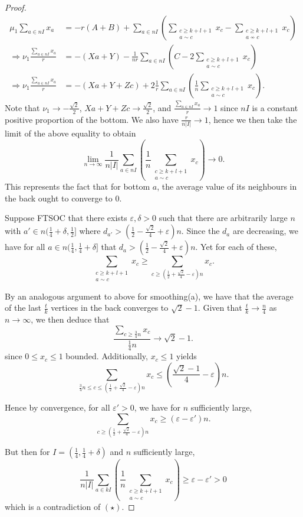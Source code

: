 \documentclass[11pt]{article}
\begin{document}
\begin{proof}
    \begin{align*}
        \mu_1 \sum_{a \in nI} x_a &= -r(A+B) + \sum_{a \in nI} \left(\sum_{\substack{c \ge k+l+1 \\ a \sim c}} x_c - \sum_{\substack{c \ge k+l+1 \\ a \not \sim c}} x_c\right) \\
        \Rightarrow \nu_1 \frac{\sum\limits_{a \in nI} x_a}{r} &= - (Xa + Y) - \frac{1}{nr} \sum_{a \in nI} \left(C - 2\sum_{\substack{c \ge k+l+1 \\ a \sim c}} x_c\right) \\
        \Rightarrow \nu_1 \frac{ \sum\limits_{a \in nI} x_a}{r} &= - (Xa + Y + Zc) + 2 \frac{1}{r} \sum_{a \in nI} \left(\frac{1}{n} \sum_{\substack{c \ge k+l+1 \\ a \sim c}} x_c\right).
    \end{align*}
    Note that $\nu_1 \to -\frac{\sqrt{2}}{2}$, $Xa + Y + Zc \to \frac{\sqrt{2}}{2}$, and $\frac{\sum_{a \in nI} x_a}{r} \to 1$ since $nI$ is a constant positive proportion of the bottom. We also have $\frac{r}{n|I|} \to 1$, hence we then take the limit of the above equality to obtain
    \[\lim_{n \to \infty} \frac{1}{n|I|} \sum_{a \in nI} \left(\frac{1}{n} \sum_{\substack{c \ge k+l+1 \\ a \sim c}} x_c\right) \to 0. \tag{$\star$}\]
    This represents the fact that for bottom $a$, the average value of its neighbours in the back ought to converge to 0.
    
    Suppose FTSOC that there exists $\varepsilon, \delta > 0$ such that there are arbitrarily large $n$ with $a' \in n(\frac14+\delta, \frac12]$ where $d_{a'} > (\frac12 - \frac{\sqrt{2}}{4} + \varepsilon)n$. Since the $d_a$ are decreasing, we have for all $a \in n(\frac14, \frac14+\delta]$ that $d_a > (\frac12 - \frac{\sqrt{2}}{4} + \varepsilon)n$. Yet for each of these, 
    \[\sum\limits_{\substack{c \ge k+l+1\\a\sim c}} x_c \ge \sum\limits_{c \ge (\frac12 + \frac{\sqrt{2}}{4} - \varepsilon)n} x_c.\]
    
    By an analogous argument to above for smoothing(a), we have that the average of the last $\frac{t}{k}$ vertices in the back converges to $\sqrt{2}-1$. Given that $\frac{t}{k} \to \frac{n}{4}$ as $n \to \infty$, we then deduce that
    \[\frac{\sum_{c \ge \frac34 n} x_c}{\frac14 n} \to \sqrt{2}-1.\]
    since $0 \le x_c \le 1$ bounded. Additionally, $x_c \le 1$ yields 
    \[\sum\limits_{\frac34 n \le c \le (\frac12 + \frac{\sqrt{2}}{4} - \varepsilon)n} x_c \le \left(\frac{\sqrt{2}-1}{4} - \varepsilon\right) n.\]
    
    Hence by convergence, for all $\varepsilon' > 0$, we have for $n$ sufficiently large, 
    \[\sum\limits_{c \ge (\frac12 + \frac{\sqrt{2}}{4} - \varepsilon)n} x_c \ge (\varepsilon - \varepsilon')n.\] 
    
    But then for $I = (\frac14, \frac14 + \delta)$ and $n$ sufficiently large,
    \[\frac{1}{n|I|} \sum_{a \in kI} \left(\frac{1}{n} \sum_{\substack{c \ge k+l+1 \\ a \sim c}} x_c\right) \ge \varepsilon - \varepsilon' > 0\]
    which is a contradiction of $(\star)$.
\end{proof}
\end{document}
